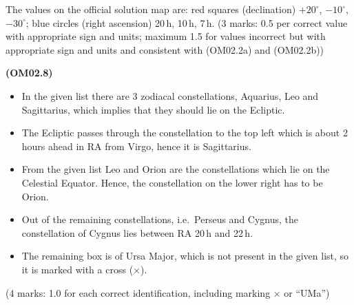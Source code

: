 The values on the official solution map are: red squares (declination)
$+20^\circ$, $-10^\circ$, $-30^\circ$; blue circles (right ascension)
20\,h, 10\,h, 7\,h.
\hfill(3 marks: 0.5 per correct value with appropriate sign and units;
maximum 1.5 for values incorrect but with appropriate sign and units and
consistent with (OM02.2a) and (OM02.2b))

\textbf{(OM02.8)}
\begin{itemize}
\item In the given list there are 3 zodiacal constellations, Aquarius, Leo
  and Sagittarius, which implies that they should lie on the Ecliptic.
\item The Ecliptic passes through the constellation to the top left which is
  about 2 hours ahead in RA from Virgo, hence it is Sagittarius.
\item From the given list Leo and Orion are the constellations which lie on
  the Celestial Equator. Hence, the constellation on the lower right has to
  be Orion.
\item Out of the remaining constellations, i.e.\ Perseus and Cygnus, the
  constellation of Cygnus lies between RA 20\,h and 22\,h.
\item The remaining box is of Ursa Major, which is not present in the given
  list, so it is marked with a cross ($\times$).
\end{itemize}
\hfill(4 marks: 1.0 for each correct identification, including marking
$\times$ or ``UMa'')

